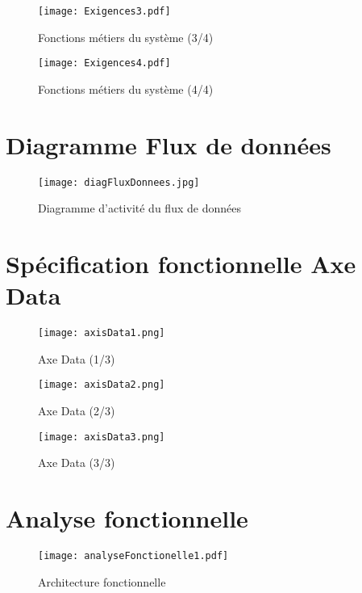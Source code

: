 \documentclass[12pt,fleqn]{book} %
\begin{document}
\begin{figure}[h!]
\centering\texttt{[image: Exigences3.pdf]}
\caption{\label{fig:exi3} Fonctions métiers du système (3/4)}
\end{figure}

\begin{figure}[h!]
\centering\texttt{[image: Exigences4.pdf]}
\caption{\label{fig:exi4} Fonctions métiers du système (4/4)}
\end{figure}

\chapter{Diagramme Flux de données}

\begin{figure}[h!]
\centering\texttt{[image: diagFluxDonnees.jpg]}
\caption{\label{fig:donnees} Diagramme d'activité du flux de données}
\end{figure}

\chapter{Spécification fonctionnelle Axe Data}

\begin{figure}[h!]
\centering\texttt{[image: axisData1.png]}
\caption{\label{fig:axeData1} Axe Data (1/3)}
\end{figure}

\begin{figure}[h!]
\centering\texttt{[image: axisData2.png]}
\caption{\label{fig:axeData2} Axe Data (2/3)}
\end{figure}

\begin{figure}[h!]
\centering\texttt{[image: axisData3.png]}
\caption{\label{fig:axeData3} Axe Data (3/3)}
\end{figure}

\chapter{Analyse fonctionnelle}

\begin{figure}[h]
\centering\texttt{[image: analyseFonctionelle1.pdf]}
\caption{\label{fig:anaFonc} Architecture fonctionnelle}
\end{figure} 
\end{document}
